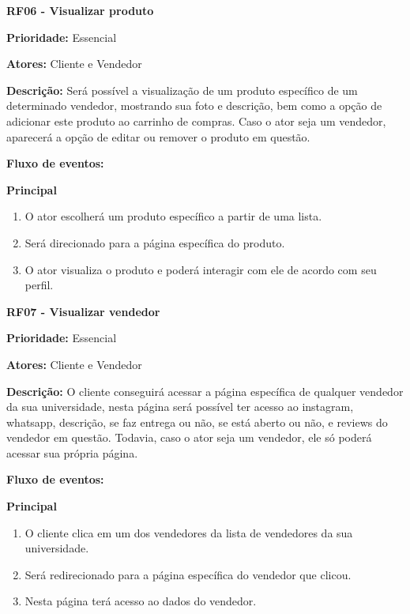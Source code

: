 \begin{apendicesenv}
\textbf{RF06 - Visualizar produto} \par
\textbf{Prioridade:} Essencial \par
\textbf{Atores:} Cliente e Vendedor \par
\textbf{Descrição:} Será possível a visualização de um produto específico de um determinado vendedor, mostrando sua foto e descrição, bem como a opção de adicionar este produto ao carrinho de compras. Caso o ator seja um vendedor, aparecerá a opção de editar ou remover o produto em questão. \par
\textbf{Fluxo de eventos:} \par
\textbf{Principal} \par
\begin{enumerate}
  \item O ator escolherá um produto específico a partir de uma lista.
  \item Será direcionado para a página específica do produto.
  \item O ator visualiza o produto e poderá interagir com ele de acordo com seu perfil.
\end{enumerate}

\textbf{RF07 - Visualizar vendedor} \par
\textbf{Prioridade:} Essencial \par
\textbf{Atores:} Cliente e Vendedor \par
\textbf{Descrição:} O cliente conseguirá acessar a página específica de qualquer vendedor da sua universidade, nesta página será possível ter acesso ao instagram, whatsapp, descrição, se faz entrega ou não, se está aberto ou não, e reviews do vendedor em questão. Todavia, caso o ator seja um vendedor, ele só poderá acessar sua própria página. \par
\textbf{Fluxo de eventos:} \par
\textbf{Principal} \par
\begin{enumerate}
  \item O cliente clica em um dos vendedores da lista de vendedores da sua universidade.
  \item Será redirecionado para a página específica do vendedor que clicou.
  \item Nesta página terá acesso ao dados do vendedor.
\end{enumerate}


\end{apendicesenv}
